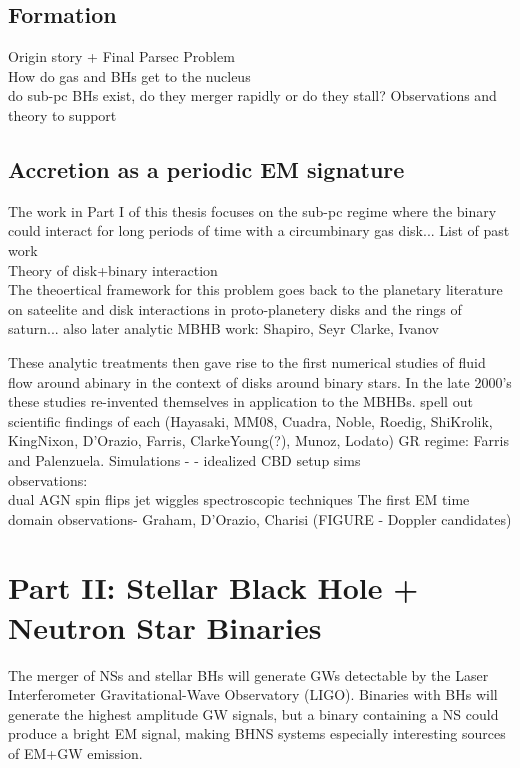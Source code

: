 \subsection{Formation}
Origin story + Final Parsec Problem\\
How do gas and BHs get to the nucleus\\
do sub-pc BHs exist, do they merger rapidly or do they stall?
Observations and theory to support

\subsection{Accretion as a periodic EM signature}
The work in Part I of this thesis focuses on the sub-pc regime where the binary could interact for long periods of time with a circumbinary gas disk...
List of past work\\

Theory of disk+binary interaction\\
The theoertical framework for this problem goes back to the planetary literature on sateelite and disk interactions in proto-planetery disks and the rings of saturn...
also later analytic MBHB work: Shapiro, Seyr Clarke, Ivanov

These analytic treatments then gave rise to the first numerical studies of fluid flow around  abinary in the context of disks around binary stars. In the late 2000's these studies re-invented themselves in application to the MBHBs. spell out scientific findings of each (Hayasaki, MM08, Cuadra, Noble, Roedig, ShiKrolik, KingNixon, D'Orazio, Farris, ClarkeYoung(?), Munoz, Lodato)
GR regime: Farris and Palenzuela.
Simulations -  - idealized CBD setup sims\\


observations:\\
dual AGN
spin flips
jet wiggles
spectroscopic techniques
The first EM time domain observations- Graham, D'Orazio, Charisi 
(FIGURE - Doppler candidates)



\section{Part II: Stellar Black Hole + Neutron Star Binaries}
The merger of NSs and stellar BHs will generate GWs detectable by the Laser
Interferometer Gravitational-Wave Observatory (LIGO). Binaries with BHs will
generate the highest amplitude GW signals, but a binary containing a NS could
produce a bright EM signal, making BHNS systems especially interesting sources
of EM+GW emission.

